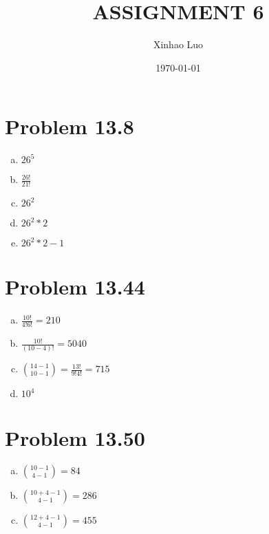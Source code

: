 \documentclass{article}
\title{\bf \Large ASSIGNMENT 6}
\author{Xinhao Luo}
\date{\today}
\def\math#1{$#1$}
\begin{document}
\maketitle
\medskip

\section{Problem 13.8}
\begin{enumerate}[a)]
    \item \math{26^5}
    \item \math{\frac{26!}{21!}}
    \item \math{26^2}
    \item \math{26^2 * 2}
    \item \math{26^2 * 2 - 1}
\end{enumerate}

\section{Problem 13.44}
\begin{enumerate}[a)]
    \item \math{\frac{10!}{4!6!} = 210}
    \item \math{\frac{10!}{(10 - 4)!} = 5040}
    \item \math{\binom{14 - 1}{10 - 1} = \frac{13!}{9!4!} = 715}
    \item \math{10^4}
\end{enumerate}

\section{Problem 13.50}
\begin{enumerate}[a)]
    \item \math{\binom{10 - 1}{4 - 1} = 84}
    \item \math{\binom{10 + 4 - 1}{4 - 1} = 286}
    \item \math{\binom{12 + 4 - 1}{4 - 1} = 455}
\end{enumerate}
\end{document}
